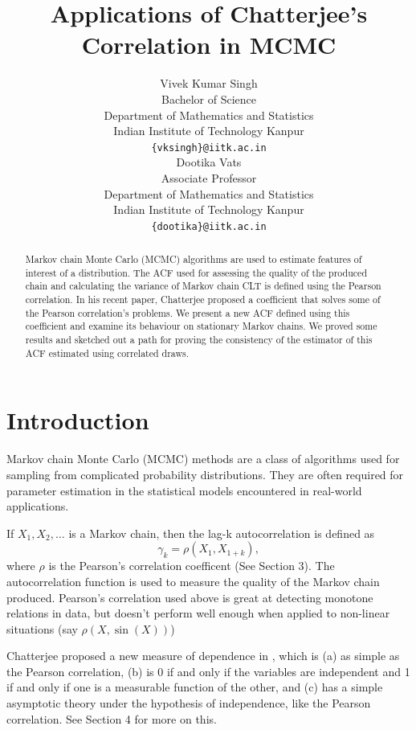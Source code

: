 \documentclass{article}
\title{Applications of Chatterjee's Correlation in MCMC
}
\author{
  Vivek Kumar Singh \\
  Bachelor of Science \\
  Department of Mathematics and Statistics \\
  Indian Institute of Technology Kanpur \\
  \texttt{\{vksingh\}@iitk.ac.in} \\
   \And
  Dootika Vats \\
  Associate Professor \\
  Department of Mathematics and Statistics \\
  Indian Institute of Technology Kanpur \\
 \texttt{\{dootika\}@iitk.ac.in}
}
\begin{document}
\maketitle
\begin{abstract}
    Markov chain Monte Carlo (MCMC) algorithms are used to estimate features of interest of a distribution.
    The ACF used for assessing the quality of the produced chain and calculating the variance of Markov chain CLT is defined using the Pearson correlation.
    In his recent paper, Chatterjee proposed a coefficient that solves some of the Pearson correlation's problems.
    We present a new ACF defined using this coefficient and examine its behaviour on stationary Markov chains.
    We proved some results and sketched out a path for proving the consistency of the estimator of this ACF estimated using correlated draws.
\end{abstract}
\section{Introduction}

	Markov chain Monte Carlo (MCMC) methods are a class of algorithms used for sampling from complicated probability distributions.
	They are often required for parameter estimation in the statistical models encountered in real-world applications.

	If $X_1, X_2, \dots$ is a Markov chain,
	then the lag-k autocorrelation is defined as
	$$\gamma_k = \rho(X_1, X_{1+k}),$$
	where $\rho$ is the Pearson's correlation coefficent (See Section 3).
	The autocorrelation function is used to measure the quality of the Markov chain produced.
	Pearson's correlation used above is great at detecting monotone relations in data,
	but doesn't perform well enough when applied to non-linear situations (say $\rho(X, \sin(X))$)

	Chatterjee proposed a new measure of dependence in \cite{chatterjee2020sourav}, which is
	(a) as simple as the Pearson correlation,
	(b) is 0 if and only if the variables are independent and 1 if and only if one is a measurable function of the other, and
	(c) has a simple asymptotic theory under the hypothesis of independence, like the Pearson correlation.
	See Section 4 for more on this.
\end{document}
